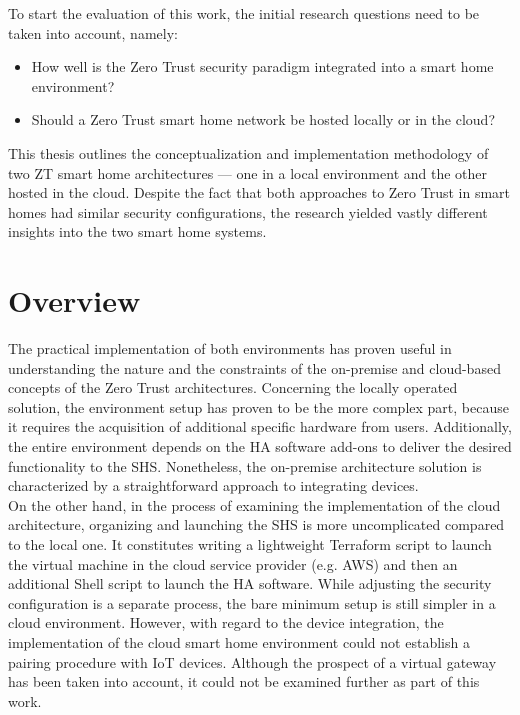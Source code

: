 To start the evaluation of this work, the initial research questions need to be taken into account, namely:
\begin{itemize}
    \item How well is the Zero Trust security paradigm integrated into a smart home environment?
    \item Should a Zero Trust smart home network be hosted locally or in the cloud?
\end{itemize}

This thesis outlines the conceptualization and implementation methodology of two ZT smart home architectures — one in a local environment and the other hosted in the cloud. Despite the fact that both approaches to Zero Trust in smart homes had similar security configurations, the research yielded vastly different insights into the two smart home systems.

\section{Overview}
The practical implementation of both environments has proven useful in understanding the nature and the constraints of the on-premise and cloud-based concepts of the Zero Trust architectures. Concerning the locally operated solution, the environment setup has proven to be the more complex part, because it requires the acquisition of additional specific hardware from users. Additionally, the entire environment depends on the HA software add-ons \cite{ha_addons} to deliver the desired functionality to the SHS. Nonetheless, the on-premise architecture solution is characterized by a straightforward approach to integrating devices.\\
On the other hand, in the process of examining the implementation of the cloud architecture, organizing and launching the SHS is more uncomplicated compared to the local one. It constitutes writing a lightweight Terraform script to launch the virtual machine in the cloud service provider (e.g. AWS) and then an additional Shell script to launch the HA software. While adjusting the security configuration is a separate process, the bare minimum setup is still simpler in a cloud environment. However, with regard to the device integration, the implementation of the cloud smart home environment could not establish a pairing procedure with IoT devices. Although the prospect of a virtual gateway has been taken into account, it could not be examined further as part of this work.

